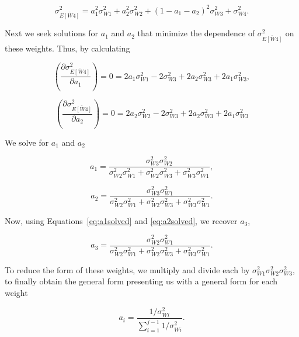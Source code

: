 \begin{equation}\label{wtd_variance}
\sigma_{\overline{E[W4]}}^2 = a_1^2 \sigma_{W1}^2 + a_2^2 \sigma_{W2}^2 + (1-a_1-a_2)^2\sigma_{W3}^2  + \sigma_{W4}^2.
\end{equation}

\noindent Next we seek solutions for $a_1$ and $a_2$ that minimize the dependence of $\sigma_{\overline{E[W4]}}^2$ on these weights. Thus, by calculating

\begin{equation}\label{eq:mina1}
\left(\frac{\partial \sigma_{\overline{E[W4]}}^2}{\partial a_1}\right) = 0 = 2a_1\sigma_{W1}^2 - 2 \sigma_{W3}^2 + 2a_2\sigma_{W3}^2 + 2a_1\sigma_{W3}^2,
\end{equation}


\begin{equation}\label{eq:mina2}
\left(\frac{\partial \sigma_{\overline{E[W4]}}^2}{\partial a_2}\right) = 0 = 2a_2\sigma_{W2}^2 - 2 \sigma_{W3}^2 + 2a_2\sigma_{W3}^2 + 2a_1\sigma_{W3}^2
\end{equation}


We solve for $a_1$ and $a_2$

\begin{equation}\label{eq:a1solved}
a_1 = \frac{\sigma_{W3}^2\sigma_{W2}^2}{\sigma_{W2}^2\sigma_{W1}^2 + \sigma_{W2}^2\sigma_{W3}^2 + \sigma_{W3}^2\sigma_{W1}^2},
\end{equation}


\begin{equation}\label{eq:a2solved}
a_2 = \frac{\sigma_{W3}^2\sigma_{W1}^2}{\sigma_{W2}^2\sigma_{W1}^2 + \sigma_{W2}^2\sigma_{W3}^2 + \sigma_{W3}^2\sigma_{W1}^2}. 
\end{equation}

\noindent Now, using Equations~\ref{eq:a1solved} and \ref{eq:a2solved}, we recover $a_3$, 

\begin{equation}\label{eq:a3solved}
a_3 = \frac{\sigma_{W2}^2\sigma_{W1}^2}{\sigma_{W2}^2\sigma_{W1}^2 + \sigma_{W2}^2\sigma_{W3}^2 + \sigma_{W3}^2\sigma_{W1}^2}.
\end{equation}

To reduce the form of these weights, we multiply and divide each by $\sigma_{W1}^2\sigma_{W2}^2\sigma_{W3}^2$, to finally obtain the general form presenting us with a general form for each weight 

\begin{equation}\label{eq:ai}
a_i = \frac{1/\sigma_{Wi}^2}{\sum_{i=1}^{j-1}1/\sigma_{Wi}^2}. 
\end{equation}

